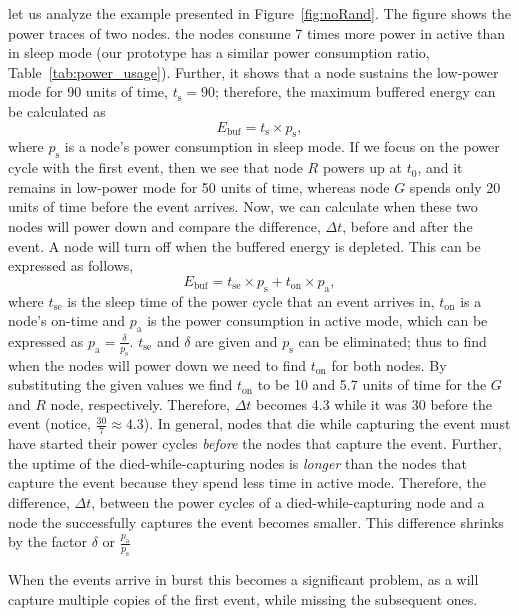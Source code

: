\begin{itemize}[leftmargin=*]
	let us analyze the example presented in Figure~\ref{fig:noRand}. The figure shows the power traces of two nodes. the nodes consume 7 times more power in active than in sleep mode (our prototype has a similar power consumption ratio, Table~\ref{tab:power_usage}). Further, it shows that a node sustains the low-power mode for 90 units of time, $t_\text{s} = 90$; therefore, the maximum buffered energy can be calculated as 
	$$E_\text{buf}=t_\text{s} \times p_\text{s},$$
	where $p_\text{s}$ is a node's power consumption in sleep mode. If we focus on the power cycle with the first event, then we see that node $R$ powers up at $t_\text{0}$, and it remains in low-power mode for 50 units of time, whereas node $G$ spends only 20 units of time before the event arrives. Now, we can calculate when these two nodes will power down and compare the difference, $\Delta t$, before and after the event. A node will turn off when the buffered energy is depleted. This can be expressed as follows, 
	$$
	E_\text{buf} = t_\text{se} \times p_\text{s} + t_\text{on} \times p_\text{a},
	$$
	where $ t_\text{se}$ is the sleep time of the power cycle that an event arrives in, $t_\text{on}$ is a node's on-time and $p_\text{a}$ is the power consumption in active mode, which can be expressed as $p_\text{a}=\frac{\delta}{p_\text{s}}$. $ t_\text{se}$ and $ \delta$ are given and $p_\text{s}$ can be eliminated; thus to find when the nodes will power down we need to find $t_\text{on}$ for both nodes. By substituting the given values we find $t_\text{on}$ to be 10 and 5.7 units of time for the $G$ and $R$ node, respectively. Therefore, $\Delta t$ becomes 4.3 while it was 30 before the event (notice, $\frac{30}{7} \approx 4.3$). 
	In general, nodes that die while capturing the event must have started their power cycles \emph{before} the nodes that capture the event.
	Further, the uptime of the died-while-capturing nodes is \emph{longer} than the nodes that capture the event because they spend less time in active mode. Therefore, the difference,  $\Delta t$, between the power cycles of a died-while-capturing node and a node the successfully captures the event becomes smaller. This difference shrinks by the factor $\delta$ or $\frac{p_\text{a}}{p_\text{s}}$


	When the events arrive in burst this becomes a significant problem, as a \cis will capture multiple copies of the first event, while missing the subsequent ones. 


\end{itemize}
